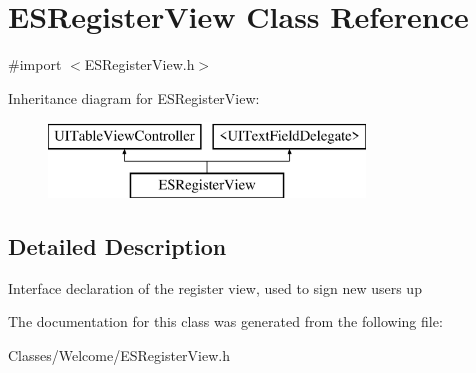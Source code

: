 \hypertarget{interface_e_s_register_view}{}\section{E\+S\+Register\+View Class Reference}
\label{interface_e_s_register_view}


{\ttfamily \#import $<$E\+S\+Register\+View.\+h$>$}

Inheritance diagram for E\+S\+Register\+View\+:\begin{figure}[H]
\begin{center}
\leavevmode
\includegraphics[height=2.000000cm]{interface_e_s_register_view}
\end{center}
\end{figure}


\subsection{Detailed Description}
Interface declaration of the register view, used to sign new users up 

The documentation for this class was generated from the following file\+:\begin{DoxyCompactItemize}
\item 
Classes/\+Welcome/E\+S\+Register\+View.\+h\end{DoxyCompactItemize}
